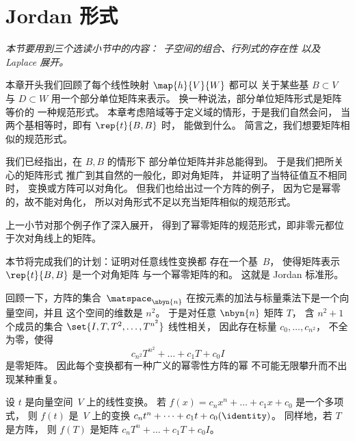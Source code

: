 \section{Jordan 形式}
\noindent\textit{本节要用到三个选读小节中的内容：~子空间的组合、行列式的存在性
以及 Laplace 展开。}

本章开头我们回顾了每个线性映射 $\map{h}{V}{W}$ 都可以
关于某些基 $B\subset V$ 与 $D\subset W$
用一个部分单位矩阵来表示。
换一种说法，部分单位矩阵形式是矩阵等价的
一种规范形式。
本章考虑陪域等于定义域的情形，于是我们自然会问，
当两个基相等时，即有 $\rep{t}{B,B}$ 时，
能做到什么。
简言之，我们想要矩阵相似的规范形式。

我们已经指出，在 $B,B$ 的情形下
部分单位矩阵并非总能得到。
于是我们把所关心的矩阵形式
推广到其自然的一般化，即对角矩阵，
并证明了当特征值互不相同时，
变换或方阵可以对角化。
但我们也给出过一个方阵的例子，
因为它是幂零的，故不能对角化，
所以对角形式不足以充当矩阵相似的规范形式。

上一小节对那个例子作了深入展开，
得到了幂零矩阵的规范形式，即非零元都位于次对角线上的矩阵。

本节将完成我们的计划：证明对任意线性变换都
存在一个基~\( B \)，
使得矩阵表示 $\rep{t}{B,B}$ 是一个对角矩阵
与一个幂零矩阵的和。
这就是 Jordan 标准形。









回顾一下，方阵的集合~\( \matspace_{\nbyn{n}} \)
在按元素的加法与标量乘法下是一个向量空间，并且
这个空间的维数是 \( n^2 \)。
于是对任意 \( \nbyn{n} \) 矩阵 $T$，
含 \( n^2+1 \) 个成员的集合 \( \set{I,T,T^2,\dots,T^{n^2} } \) 线性相关，
因此存在标量 \( c_0,\dots,c_{n^2} \)，
不全为零，使得
\begin{equation*}
  c_{n^2}T^{n^2}+\dots+c_1T+c_0I
\end{equation*}
是零矩阵。
因此每个变换都有一种广义的幂零性\Dash 方阵的幂
不可能无限攀升而不出现某种重复。

\begin{definition}
设 \( t \) 是向量空间~\( V \) 上的线性变换。
若 \( f(x)=c_nx^n+\dots+c_1x+c_0 \) 是一个多项式，
则 \( f(t) \) 是~\( V \) 上的变换
\( c_nt^n+\dots+c_1t+c_0(\identity) \)。
同样地，若 \( T \) 是方阵，
则
\( f(T) \) 是矩阵 \( c_nT^n+\dots+c_1T+c_0I \)。
\end{definition}

